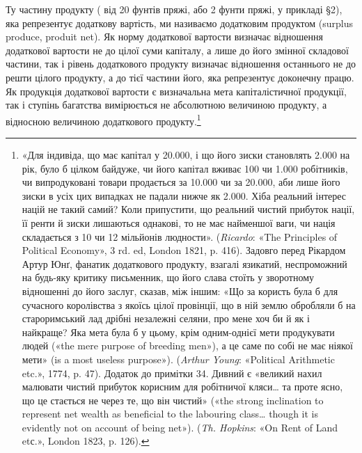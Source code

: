 Ту частину продукту ( від 20 фунтів пряжі, або 2 фунти пряжі, у
прикладі §2), яка репрезентує додаткову вартість, ми
називаємо додатковим продуктом (surplus produce, produit net). Як норму
додаткової вартости визначає відношення додаткової
вартости не до цілої суми капіталу, а лише до його змінної складової частини,
так і рівень додаткового продукту визначає відношення останнього не до решти
цілого продукту, а до тієї частини його, яка репрезентує доконечну працю.
Як продукція додаткової вартости є визначальна мета
капіталістичної продукції, так і ступінь багатства вимірюється не абсолютною
величиною продукту, а відносною величиною додаткового продукту.\footnote{
«Для індивіда, що має капітал у 20.000, і що його зиски
становлять 2.000 на рік, було б цілком байдуже, чи його
капітал вживає 100 чи 1.000 робітників, чи випродуковані товари продається
за 10.000 чи за 20.000, аби лише
його зиски в усіх цих випадках не падали нижче як 2.000. Хіба реальний інтерес націй не такий самий? Коли припустити, що
реальний чистий прибуток нації, її ренти й зиски лишаються однакові, то не має
найменшої ваги, чи нація складається з 10 чи
12 мільйонів людности». (\emph{Ricardo}: «The Principles of Political Economy»,
3 rd. ed, London 1821, p. 416). Задовго перед Рікардом Артур Юнґ, фанатик
додаткового продукту, взагалі язикатий, неспроможний
на будь-яку критику письменник, що його слава стоїть у зворотному відношенні
до його заслуг, сказав, між іншим: «Що за користь була б для сучасного
королівства з якоїсь цілої провінції, що в ній землю обробляли б на
староримський лад дрібні незалежні селяни, про мене хоч би
й як і найкраще? Яка мета була б у цьому, крім одним-однієї мети продукувати
людей («the mere purpose of breeding men»), а це саме по собі не має
ніякої мети» (is a most useless purpose»). (\emph{Arthur Young}: «Political
Arithmetic etc.», 1774, p. 47).
Додаток до примітки 34. Дивний є «великий нахил малювати чистий прибуток
корисним для робітничої кляси\dots{} та проте ясно, що це стається не через те,
що він чистий» («the strong inclination to
represent net wealth as beneficial to the labouring class\dots{} though it
is evidently not on account
of being net»). (\emph{Th. Hopkins}: «On Rent of Land etс.», London 1823, p. 126).
}
